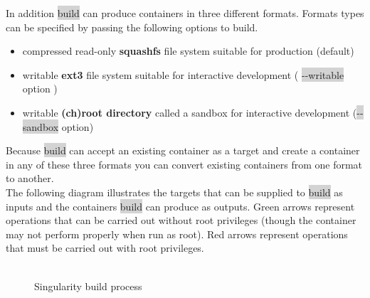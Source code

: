 \documentclass[a4paper]{article}
\begin{document}
In addition \colorbox{lightgray}{build} can produce containers in three different formats. Formats types can be specified by passing the following options to build.
\\
\begin{itemize}
\item compressed read-only \textbf{squashfs} file system suitable for production (default)
\item writable \textbf{ext3} file system suitable for interactive development ( \colorbox{lightgray}{-{}-writable} option )
\item writable \textbf{(ch)root directory} called a sandbox for interactive development (\colorbox{lightgray}{-{}-sandbox} option)
\end{itemize}

Because \colorbox{lightgray}{build} can accept an existing container as a target and create a container in any of these three formats you can convert existing containers from one format to another.\\

The following diagram illustrates the targets that can be supplied to \colorbox{lightgray}{build} as inputs and the containers \colorbox{lightgray}{build} can produce as outputs. Green arrows represent operations that can be carried out without root privileges (though the container may not perform properly when run as root). Red arrows represent operations that must be carried out with root privileges.


\begin{figure}[h]
\centering
\hspace*{-0.62in}
\includegraphics[width=0.5,height=0.5]{build_input_output.png}
\caption{Singularity build process}
\end{figure}
\end{document}
